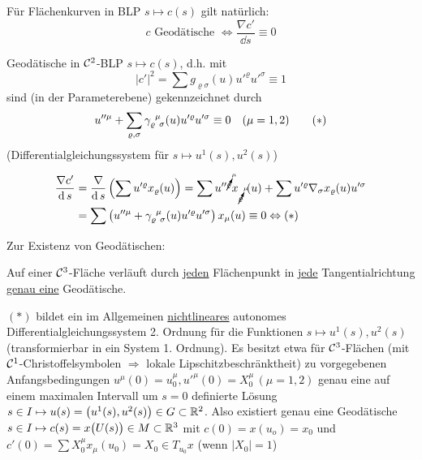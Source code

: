 Für Flächenkurven in BLP \(s \mapsto c(s)\) gilt natürlich:
\[
 c \text{ Geodätische } \Leftrightarrow \frac{\nabla c'}{\dd s} \equiv 0
\]
\Links
\begin{folgerung}
 Geodätische in \(\mathcal{C}^2\)-BLP \(s \mapsto c(s)\), d.h. mit
 \[
  |c'|^2 = \sum g_{\varrho \sigma}(u) u'^\varrho u'^\sigma \equiv 1
 \]
 sind (in der Parameterebene) gekennzeichnet durch
 \begin{align*}
  u''^\mu + \sum_{\varrho, \sigma} \gamma_{\varrho \;\, \sigma}^{\;\, \mu} (u) u'^\varrho u'^\sigma \equiv 0  \quad (\mu = 1,2) \tag{\(\ast\)}
 \end{align*}
\big(Differentialgleichungssystem für \(s \mapsto u^1(s), u^2(s)\)\big)
\end{folgerung}

\begin{beweis}
 \begin{align*}
  \frac{\nabla c'}{\operatorname{d} s} &= \frac{\nabla}{\operatorname{d} s} \left(\sum u'^\varrho x_\varrho(u) \right) = \sum u''^{\cancelto{\mu}{\varrho}} x_{\cancelto{\mu}{\varrho}} \;(u) + \sum u'^\varrho \nabla_{\sigma} x_\varrho (u) u'^\sigma \\
  &= \sum \left(u''^\mu + \gamma_{\varrho \;\, \sigma}^{\;\, \mu} (u) u'^\varrho u'^\sigma \right) x_\mu (u) \equiv 0 \Leftrightarrow (\ast)
 \end{align*}
\end{beweis}

Zur Existenz von Geodätischen:

\begin{satz}\label{satz222}
 Auf einer \(\mathcal{C}^3\)-Fläche verläuft durch \uline{jeden} Flächenpunkt in \uline{jede} Tangentialrichtung \uline{genau eine} Geodätische.
\end{satz}

\begin{beweis}
 \((\ast)\) bildet ein im Allgemeinen \uline{nichtlineares} autonomes Differentialgleichungssystem 2. Ordnung für die Funktionen \(s \mapsto u^1(s), u^2(s)\) (transformierbar in ein System 1. Ordnung). Es besitzt etwa für \(\mathcal{C}^3\)-Flächen (mit \(\mathcal{C}^1\)-Christoffelsymbolen \(\Rightarrow\) lokale Lipschitzbeschränktheit) zu vorgegebenen Anfangsbedingungen \(u^\mu(0) = u_0^\mu, u'^\mu(0) = X_0^\mu \,(\mu = 1,2)\) genau eine auf einem maximalen Intervall um \(s = 0\) definierte Lösung \(s \in I \mapsto u(s) = \big(u^1(s),u^2(s)\big) \in G \subset \mathbb{R}^2\). Also existiert genau eine Geodätische \(s \in I \mapsto c(s) = x\big( U(s)\big) \in M \subset \mathbb{R}^3\) mit \(c(0) = x(u_o) = x_0\) und \(c'(0) = \sum X_0^\mu x_\mu(u_0) = X_0 \in T_{u_0}x\) (wenn \(|X_0| = 1\))
\end{beweis}

